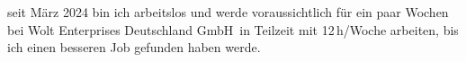 		seit März 2024 bin ich arbeitslos und werde voraussichtlich für ein paar Wochen bei \glqq Wolt Enterprises Deutschland GmbH\grqq\ in Teilzeit mit 12\,h/Woche arbeiten, bis ich einen besseren Job gefunden haben werde.